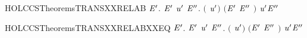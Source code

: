 \newcommand{\HOLCCSTheoremsTRANSXXRECXXEQ}{\UseVerbatim{HOLCCSTheoremsTRANSXXRECXXEQ}}
\begin{SaveVerbatim}{HOLCCSTheoremsTRANSXXRELAB}
\HOLTokenTurnstile{} \HOLSymConst{\HOLTokenForall{}}   \ensuremath{\HOLBoundVar{E}\sp{\prime}}.
          \HOLTokenTransBegin{}\HOLTokenTransEnd \ensuremath{\HOLBoundVar{E}\sp{\prime}} \HOLSymConst{\HOLTokenImp{}}
       \HOLSymConst{\HOLTokenExists{}}\ensuremath{\HOLBoundVar{u}\sp{\prime}} \ensuremath{\HOLBoundVar{E}\sp{\prime\prime}}.
           \ensuremath{(} \HOLSymConst{\ensuremath{=}}   \ensuremath{\HOLBoundVar{u}\sp{\prime}}\ensuremath{)} \HOLSymConst{\HOLTokenConj{}} \ensuremath{(}\ensuremath{\HOLBoundVar{E}\sp{\prime}} \HOLSymConst{\ensuremath{=}}  \ensuremath{\HOLBoundVar{E}\sp{\prime\prime}} \ensuremath{)} \HOLSymConst{\HOLTokenConj{}}
            \HOLTokenTransBegin\ensuremath{\HOLBoundVar{u}\sp{\prime}}\HOLTokenTransEnd \ensuremath{\HOLBoundVar{E}\sp{\prime\prime}}
\end{SaveVerbatim}
\newcommand{\HOLCCSTheoremsTRANSXXRELAB}{\UseVerbatim{HOLCCSTheoremsTRANSXXRELAB}}
\begin{SaveVerbatim}{HOLCCSTheoremsTRANSXXRELABXXEQ}
\HOLTokenTurnstile{} \HOLSymConst{\HOLTokenForall{}}   \ensuremath{\HOLBoundVar{E}\sp{\prime}}.
          \HOLTokenTransBegin{}\HOLTokenTransEnd \ensuremath{\HOLBoundVar{E}\sp{\prime}} \HOLSymConst{\HOLTokenEquiv{}}
       \HOLSymConst{\HOLTokenExists{}}\ensuremath{\HOLBoundVar{u}\sp{\prime}} \ensuremath{\HOLBoundVar{E}\sp{\prime\prime}}.
           \ensuremath{(} \HOLSymConst{\ensuremath{=}}   \ensuremath{\HOLBoundVar{u}\sp{\prime}}\ensuremath{)} \HOLSymConst{\HOLTokenConj{}} \ensuremath{(}\ensuremath{\HOLBoundVar{E}\sp{\prime}} \HOLSymConst{\ensuremath{=}}  \ensuremath{\HOLBoundVar{E}\sp{\prime\prime}} \ensuremath{)} \HOLSymConst{\HOLTokenConj{}}
            \HOLTokenTransBegin\ensuremath{\HOLBoundVar{u}\sp{\prime}}\HOLTokenTransEnd \ensuremath{\HOLBoundVar{E}\sp{\prime\prime}}
\end{SaveVerbatim}
\newcommand{\HOLCCSTheoremsTRANSXXRELABXXEQ}{\UseVerbatim{HOLCCSTheoremsTRANSXXRELABXXEQ}}
